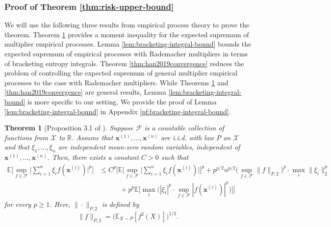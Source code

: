\documentclass[10pt]{article}
\newtheorem{theorem}{Theorem}
\newcommand{\E}{{\mathbb E}}
\newcommand{\F}{{\mathcal{F}}}
\newcommand{\R}{{\mathbb R}}
\newcommand{\xbf}{{\mathbf{x}}}
\begin{document}
\subsubsection{Proof of Theorem \ref{thm:risk-upper-bound}}
\label{pf:risk-upper-bound}
We will use the following three results from empirical process theory to prove 
the theorem. Theorem \ref{thm:moment-inequality} provides a moment inequality 
for the expected supremum of multiplier empirical processes. 
Lemma \ref{lem:bracketing-integral-bound} bounds the expected supremum of 
empirical processes with Rademacher multipliers in terms of bracketing entropy 
integrals. Theorem \ref{thm:han2019convergence} reduces the problem of 
controlling the expected supremum of general multiplier empirical processes to 
the case with Rademacher multipliers. While Theorems \ref{thm:moment-inequality} and
\ref{thm:han2019convergence} are general results,
Lemma \ref{lem:bracketing-integral-bound} is more specific to our setting. 
We provide the proof of Lemma \ref{lem:bracketing-integral-bound} in Appendix 
\ref{pf:bracketing-integral-bound}.

\begin{theorem}[Proposition 3.1 of \citet{gine2000exponential}]
\label{thm:moment-inequality}
Suppose $\F$ is a countable collection of functions from $\mathcal{X}$ to $\R$.
Assume that $\xbf^{(1)}, \dots, \xbf^{(n)}$ are i.i.d. with law $P$ 
on $\mathcal{X}$ and that $\xi_1, \dots, \xi_n$ are independent mean-zero random 
variables, independent of $\xbf^{(1)}, \dots, \xbf^{(n)}$. Then, 
there exists a constant $C > 0$ such that
\begin{equation*}
\begin{aligned}
    \E\Big[\sup_{f \in \F} \Big|\sum_{i = 1}^{n} 
    \xi_i f(\xbf^{(i)})\Big|^p \Big] 
    &\le C^p \bigg[ \E \Big[\sup_{f \in \F} \Big|\sum_{i = 1}^{n} 
    \xi_i f(\xbf^{(i)})\Big|\Big]^p
    + p^{p/2} n^{p/2} \Big(\sup_{f \in \F} \|f\|_{P, 2}\Big)^p 
    \cdot \max_i \|\xi_i\|_2^p \\
    &\qquad \quad + p^p \E \Big[\max_i \Big(|\xi_i|^p \cdot 
    \sup_{f \in \F} |f(\xbf^{(i)})|^p \Big)\Big]\bigg]
\end{aligned}
\end{equation*}
for every $p \ge 1$. Here, $\|\cdot\|_{P, 2}$ is defined by
\begin{equation*}
    \|f\|_{P, 2} = \big(\E_{X \sim P} [f^2(X)]\big)^{1/2}.
\end{equation*}
\end{theorem}
\end{document}
